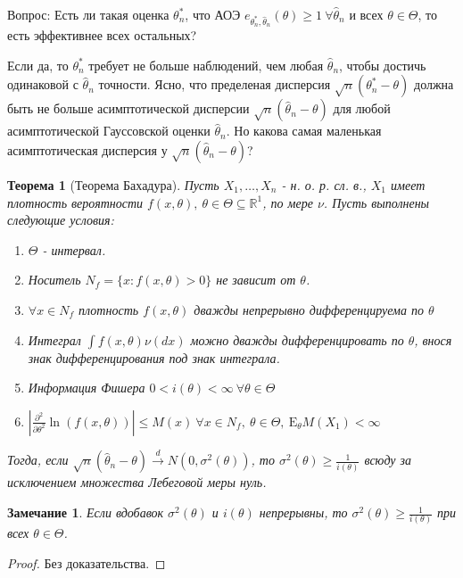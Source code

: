 \documentclass[12pt]{article}
\newtheorem*{remark}{Замечание}
\theoremstyle{basic_theorem}
\theoremstyle{name_theorem}
\newtheorem*{named_theorem}{Теорема}
\def\R{
    \mathbb{R}
}
\def\E{
    \mathrm{E}
}
\begin{document}
    Вопрос: Есть ли такая оценка $\theta^*_n$, что АОЭ $e_{\theta^*_n, \widehat{\theta}_n}(\theta) \geq 1 \ \forall \widehat{\theta}_n$
    и всех $\theta \in \Theta$, то есть эффективнее всех остальных?
    
    Если да, то $\theta^*_n$ требует не больше наблюдений, чем любая $\widehat{\theta}_n$, чтобы достичь одинаковой с $\widehat{\theta}_n$ точности.
    Ясно, что пределеная дисперсия $\sqrt{n}(\theta^*_n - \theta)$ должна быть не больше асимптотической дисперсии
    $\sqrt{n}(\widehat{\theta}_n - \theta)$ для любой асимптотической Гауссовской оценки $\widehat{\theta}_n$. Но
    какова самая маленькая асимптотическая дисперсия у $\sqrt{n}(\widehat{\theta}_n - \theta)$?
    
    \begin{named_theorem}[Теорема Бахадура]
        \label{th::bahadur}
        Пусть $X_1, \ldots, X_n$ - н. о. р. сл. в., $X_1$ имеет
        плотность вероятности $f(x, \theta),\ \theta \in \Theta \subseteq \R^1$,
        по мере $\nu$. Пусть выполнены следующие условия:
        \begin{enumerate}
            \item $\Theta$ - интервал.
            \item Носитель $N_f = \{x: f(x, \theta) > 0\}$ не зависит от $\theta$.
            \item \label{th::bahadur:density} $\forall x \in N_f$ плотность $f(x, \theta)$ дважды непрерывно
                дифференцируема по $\theta$
            \item \label{th::bahadur:integral} Интеграл $\int f(x, \theta)\nu(dx)$  можно
                дважды дифференцировать по $\theta$, внося знак
                дифференцирования под знак интеграла.
            \item Информация Фишера $0 < i(\theta) < \infty \ \forall \theta \in \Theta$
            \item \label{th::bahadur:second_partial} $\left\lvert \frac{\partial^2}{\partial \theta^2} \ln(f(x, \theta)) \right\rvert  \leq M(x) \ \forall x \in N_f, \ \theta \in \Theta, \ \E_\theta M(X_1) < \infty$ 
        \end{enumerate}
        Тогда, если $\sqrt{n}(\widehat{\theta}_n - \theta) \xrightarrow{d} N(0, \sigma^2(\theta))$,
        то $\sigma^2(\theta) \geq \frac{1}{i(\theta)}$ всюду за исключением
        множества Лебеговой меры нуль.
    \end{named_theorem}
    \begin{remark}
        Если вдобавок $\sigma^2(\theta)$ и $i(\theta)$ непрерывны,
        то $\sigma^2(\theta) \geq \frac{1}{i(\theta)}$ при всех $\theta \in \Theta$.
    \end{remark}
    \begin{proof}
        Без доказательства.
    \end{proof}
\end{document}
